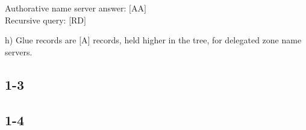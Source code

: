   Authorative name server answer: $[$AA$]$\\
  Recursive query: $[$RD$]$

h) Glue records are $[$A$]$ records, held higher in the tree, for delegated zone name servers.

\subsection{1-3}


\subsection{1-4}

